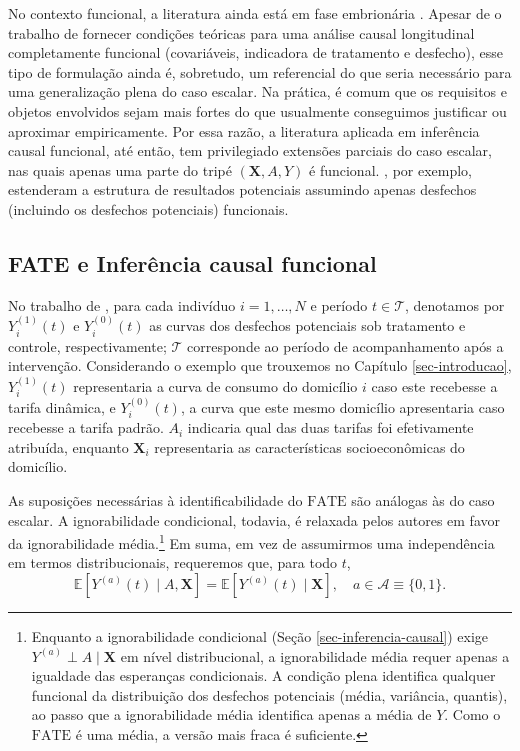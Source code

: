 No contexto funcional, a literatura ainda está em fase embrionária \cite{belloni_program_2017, ecker_causal_2024, wong_kernel-based_2018, colantuoni_statistical_2018, sparkes_functional_2024}. 
Apesar de o trabalho de  fornecer condições teóricas para uma análise causal longitudinal completamente funcional (covariáveis, indicadora de tratamento e desfecho), esse tipo de formulação ainda é, sobretudo, um referencial do que seria necessário para uma generalização plena do caso escalar. 
Na prática, é comum que os requisitos e objetos envolvidos sejam mais fortes do que usualmente conseguimos justificar ou aproximar empiricamente. 
Por essa razão, a literatura aplicada em inferência causal funcional, até então, tem privilegiado extensões parciais do caso escalar, nas quais apenas uma parte do tripé \((\mathbf{X}, A, Y)\) é funcional. 
, por exemplo, estenderam a estrutura de resultados potenciais assumindo apenas desfechos (incluindo os desfechos potenciais) funcionais.

\subsection{FATE e Inferência causal funcional}\label{sec-inferencia-causal-funcional}

No trabalho de , para cada indivíduo \(i = 1, \dots, N\) e período \(t \in \mathcal{T}\), denotamos por \(Y_i^{(1)}(t)\) e \(Y_i^{(0)}(t)\) as curvas dos desfechos potenciais sob tratamento e controle, respectivamente; \(\mathcal{T}\) corresponde ao período de acompanhamento após a intervenção.
Considerando o exemplo que trouxemos no Capítulo \ref{sec-introducao}, \(Y_i^{(1)}(t)\) representaria a curva de consumo do domicílio \(i\) caso este recebesse a tarifa dinâmica, e \(Y_i^{(0)}(t)\), a curva que este mesmo domicílio apresentaria caso recebesse a tarifa padrão.
\(A_i\) indicaria qual das duas tarifas foi efetivamente atribuída, enquanto \(\mathbf{X}_i\) representaria as características socioeconômicas do domicílio.

As suposições necessárias à identificabilidade do \(\mathrm{FATE}\) são análogas às do caso escalar. A ignorabilidade condicional, todavia, é relaxada pelos autores em favor da ignorabilidade média.\footnote{Enquanto a ignorabilidade condicional (Seção \ref{sec-inferencia-causal}) exige \({Y^{(a)}} \perp A \mid \mathbf{X}\) em nível distribucional, a ignorabilidade média requer apenas a igualdade das esperanças condicionais. 
A condição plena identifica qualquer funcional da distribuição dos desfechos potenciais (média, variância, quantis), ao passo que a ignorabilidade média identifica apenas a média de \(Y\). 
Como o \(\mathrm{FATE}\) é uma média, a versão mais fraca é suficiente.} 
Em suma, em vez de assumirmos uma independência em termos distribucionais, requeremos que, para todo \(t\),
\[
    \mathbb{E}[Y^{(a)}(t) \mid A, \mathbf{X}] = \mathbb{E}[Y^{(a)}(t) \mid \mathbf{X}],
    \quad a \in \mathcal{A} \equiv \{0, 1\}.
\]

